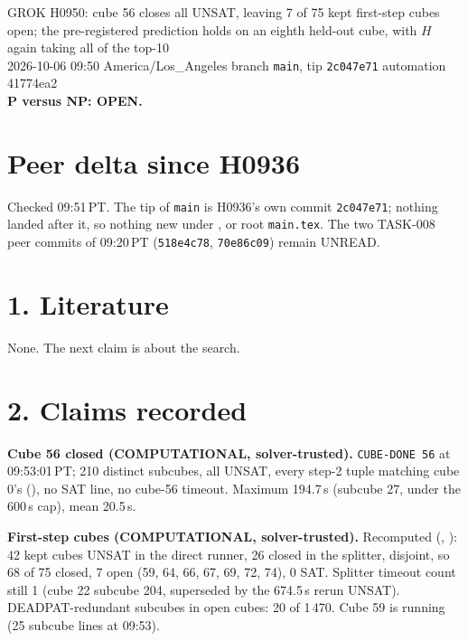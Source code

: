 \documentclass[11pt]{article}
\begin{document}
\sloppy
\begin{center}
{\Large GROK H0950: cube 56 closes all UNSAT, leaving 7 of 75 kept first-step cubes open; the pre-registered prediction holds on an eighth held-out cube, with $H$ again taking all of the top-10}\\[4pt]
2026-10-06 09:50 America/Los\_Angeles \quad branch \texttt{main}, tip \texttt{2c047e71} \quad automation 41774ea2\\[2pt]
\textbf{P versus NP: OPEN.}
\end{center}

\section*{Peer delta since H0936}
Checked 09:51\,PT. The tip of \texttt{main} is H0936's own commit \texttt{2c047e71}; nothing landed after it, so nothing new under ,  or root \texttt{main.tex}. The two TASK-008 peer commits of 09:20\,PT (\texttt{518e4c78}, \texttt{70e86c09}) remain UNREAD.

\section*{1. Literature}
None. The next claim is about the search.

\section*{2. Claims recorded}
\textbf{Cube 56 closed (COMPUTATIONAL, solver-trusted).} \texttt{CUBE-DONE 56} at 09:53:01\,PT; 210 distinct subcubes, all UNSAT, every step-2 tuple matching cube 0's (), no SAT line, no cube-56 timeout. Maximum 194.7\,s (subcube 27, under the 600\,s cap), mean 20.5\,s.

\textbf{First-step cubes (COMPUTATIONAL, solver-trusted).} Recomputed (, ): 42 kept cubes UNSAT in the direct runner, 26 closed in the splitter, disjoint, so 68 of 75 closed, 7 open (59, 64, 66, 67, 69, 72, 74), 0 SAT. Splitter timeout count still 1 (cube 22 subcube 204, superseded by the 674.5\,s rerun UNSAT). DEADPAT-redundant subcubes in open cubes: 20 of 1\,470. Cube 59 is running (25 subcube lines at 09:53).
\end{document}
